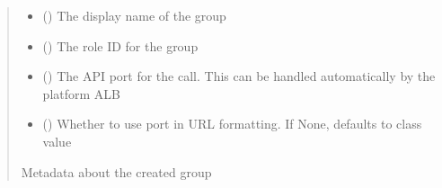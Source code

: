 \documentclass[letterpaper,10pt,english]{sphinxmanual}
\begin{document}
\begin{fulllineitems}
\begin{fulllineitems}
\begin{sphinxVerbatim}[commandchars=\\\{\}]
 
  
\end{sphinxVerbatim}
\begin{quote}\begin{description}
\begin{itemize}
\item {} 
\sphinxAtStartPar
{} () \textendash{} The display name of the group

\item {} 
\sphinxAtStartPar
{} () \textendash{} The role ID for the group

\item {} 
\sphinxAtStartPar
{} (\sphinxstyleliteralemphasis{\sphinxupquote{ (}}\sphinxstyleliteralemphasis{\sphinxupquote{)}}) \textendash{} The API port for the call. This can be handled automatically by the platform ALB

\item {} 
\sphinxAtStartPar
{} (\sphinxstyleliteralemphasis{\sphinxupquote{ (}}\sphinxstyleliteralemphasis{\sphinxupquote{)}}) \textendash{} Whether to use port in URL formatting. If None, defaults to class value

\end{itemize}

\sphinxAtStartPar
{} \textendash{} Metadata about the created group


\end{description}
\end{quote}
\end{fulllineitems}
\end{fulllineitems}
\end{document}
